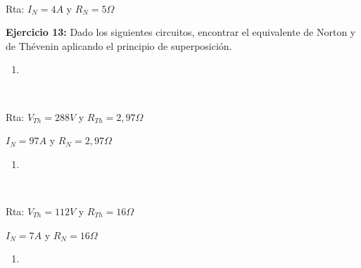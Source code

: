 \documentclass[11pt]{article}
\providecommand{\tightlist}{%
      \setlength{\itemsep}{0pt}\setlength{\parskip}{0pt}}
\begin{document}
    \begin{center}
    \end{center}
    { \hspace*{\fill} \\}
    
    Rta: \(I_{N}=4A\) y \(R_{N}=5\Omega\)

\textbf{Ejercicio 13:} Dado los siguientes circuitos, encontrar el
equivalente de Norton y de Thévenin aplicando el principio de
superposición.

\begin{enumerate}
\def\labelenumi{\alph{enumi})}
\tightlist
\item
\end{enumerate}

    \begin{center}
    \end{center}
    { \hspace*{\fill} \\}
    
    Rta: \(V_{Th}=288V\) y \(R_{Th}=2,97\Omega\)

\(I_{N}=97A\) y \(R_{N}=2,97\Omega\)

\begin{enumerate}
\def\labelenumi{\alph{enumi})}
\setcounter{enumi}{1}
\tightlist
\item
\end{enumerate}

    \begin{center}
    \end{center}
    { \hspace*{\fill} \\}
    
    Rta: \(V_{Th}=112V\) y \(R_{Th}=16\Omega\)

\(I_{N}=7A\) y \(R_{N}=16\Omega\)

\begin{enumerate}
\def\labelenumi{\alph{enumi})}
\setcounter{enumi}{2}
\tightlist
\item
\end{enumerate}

    \begin{center}
    \end{center}
    { \hspace*{\fill} \\}
    
\end{document}
